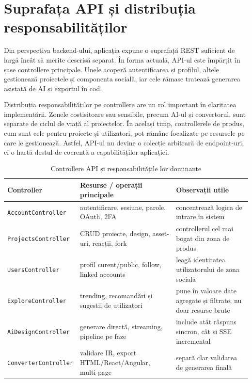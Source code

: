 \section{Suprafața API și distribuția responsabilităților}

Din perspectiva backend-ului, aplicația expune o suprafață REST suficient de largă încât să merite descrisă separat. În forma actuală, API-ul este împărțit în șase controllere principale. Unele acoperă autentificarea și profilul, altele gestionează proiectele și componenta socială, iar cele rămase tratează generarea asistată de AI și exportul în cod.

Distribuția responsabilităților pe controllere are un rol important în claritatea implementării. Zonele costisitoare sau sensibile, precum AI-ul și convertorul, sunt separate de ciclul de viață al proiectelor. În același timp, controllerele de produs, cum sunt cele pentru proiecte și utilizatori, pot rămâne focalizate pe resursele pe care le gestionează. Astfel, API-ul nu devine o colecție arbitrară de endpoint-uri, ci o hartă destul de coerentă a capabilităților aplicației.

\begin{table}[H]
  \centering
  \caption{Controllere API și responsabilitățile lor dominante}
  \label{tab:controllere-api}
  \renewcommand{\arraystretch}{1.15}
  \begin{tabularx}{\textwidth}{>{\RaggedRight\arraybackslash}p{3.8cm}>{\RaggedRight\arraybackslash}p{4.8cm}Y}
    \toprule
    \textbf{Controller} & \textbf{Resurse / operații principale} & \textbf{Observații utile} \\
    \midrule
    \texttt{AccountController} & autentificare, sesiune, parole, OAuth, 2FA & concentrează logica de intrare în sistem \\
    \texttt{ProjectsController} & CRUD proiecte, design, asset-uri, reacții, fork & controllerul cel mai bogat din zona de produs \\
    \texttt{UsersController} & profil curent/public, follow, linked accounts & leagă identitatea utilizatorului de zona socială \\
    \texttt{ExploreController} & trending, recomandări și sugestii de utilizatori & pune în valoare date agregate și filtrate, nu doar resurse brute \\
    \texttt{AiDesignController} & generare directă, streaming, pipeline pe faze & include atât răspuns sincron, cât și SSE incremental \\
    \texttt{ConverterController} & validare IR, export HTML/React/Angular, multi-page & separă clar validarea de generarea finală \\
    \bottomrule
  \end{tabularx}
\end{table}

